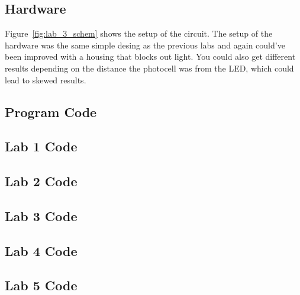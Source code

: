 \documentclass[12pt,titlepage]{article}
\begin{document}
\subsection{Hardware}
Figure~\ref{fig:lab_3_schem} shows the setup of the circuit. The setup of the hardware was the same simple desing as the previous labs and again could've been improved with a
housing that blocks out light. You could also get different results depending on the distance the photocell was from the LED, which could lead to skewed results.
\begin{appendices}
  \section{Program Code}
  \subsection{Lab 1 Code}
  \begin{minipage}{\linewidth}
    
  \end{minipage} 
  \begin{minipage}{\linewidth}
    
  \end{minipage} 
  \subsection{Lab 2 Code}
    
  \subsection{Lab 3 Code}
    
  \subsection{Lab 4 Code}
    
    
  \subsection{Lab 5 Code}
    
    
\end{appendices}
\end{document}
